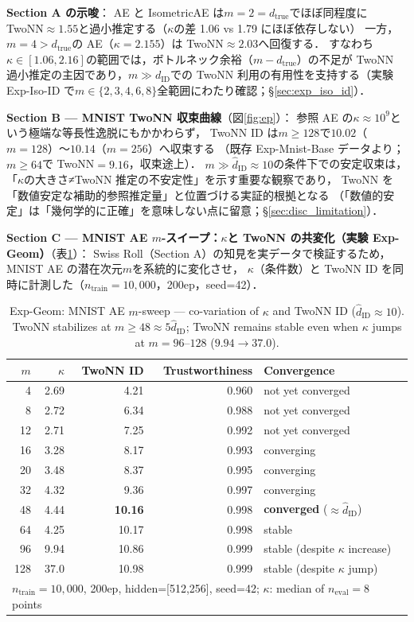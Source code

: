 \documentclass[11pt,a4paper]{jsarticle}
\newcommand{\kap}{\kappa}
\begin{document}
\textbf{Section A の示唆}：
AE と IsometricAE は$m=2=d_\mathrm{true}$でほぼ同程度に TwoNN$\approx1.55$と過小推定する（$\kap$の差 1.06 vs 1.79 にほぼ依存しない）
一方，$m=4>d_\mathrm{true}$の AE（$\kap=2.155$）は TwoNN$\approx2.03$へ回復する．
すなわち$\kap \in [1.06, 2.16]$の範囲では，ボトルネック余裕（$m - d_\mathrm{true}$）の不足が
TwoNN 過小推定の主因であり，$m \gg d_\mathrm{ID}$での TwoNN 利用の有用性を支持する（実験 Exp-Iso-ID で$m \in \{2,3,4,6,8\}$全範囲にわたり確認；§\ref{sec:exp_iso_id}）．

\textbf{Section B — MNIST TwoNN 収束曲線}（図\ref{fig:ep}）：
参照 AE の$\kap \approx 10^9$という極端な等長性逸脱にもかかわらず，
TwoNN ID は$m \geq 128$で$10.02$（$m=128$）〜$10.14$（$m=256$）へ収束する
（既存 Exp-Mnist-Base データより；$m \geq 64$で TwoNN$=9.16$，収束途上）．
$m \gg \hat{d}_\mathrm{ID} \approx 10$の条件下での安定収束は，
「$\kap$の大きさ≠TwoNN 推定の不安定性」を示す重要な観察であり，
TwoNN を「数値安定な補助的参照推定量」と位置づける実証的根拠となる
（「数値的安定」は「幾何学的に正確」を意味しない点に留意；§\ref{sec:disc_limitation}）．

\textbf{Section C — MNIST AE $m$-スイープ：$\kappa$と TwoNN の共変化（実験 Exp-Geom）}（表\ref{tab:eq_mnist}）：
Swiss Roll（Section A）の知見を実データで検証するため，MNIST AE の潜在次元$m$を系統的に変化させ，
$\kap$（条件数）と TwoNN ID を同時に計測した（$n_\mathrm{train}=10{,}000$，200ep，seed=42）．

\begin{table}[H]
\centering
\caption{Exp-Geom: MNIST AE $m$-sweep --- co-variation of $\kap$ and TwoNN ID ($\hat{d}_\mathrm{ID}\approx10$). TwoNN stabilizes at $m \geq 48 \approx 5\hat{d}_\mathrm{ID}$; TwoNN remains stable even when $\kap$ jumps at $m=96$--$128$ ($9.94\to37.0$).}
\label{tab:eq_mnist}
\small
\begin{tabular}{rrrrl}
\toprule
$m$ & $\kap$ & TwoNN ID & Trustworthiness & Convergence \\
\midrule
 4  & 2.69 & 4.21 & 0.960 & not yet converged \\
 8  & 2.72 & 6.34 & 0.988 & not yet converged \\
12  & 2.71 & 7.25 & 0.992 & not yet converged \\
16  & 3.28 & 8.17 & 0.993 & converging \\
20  & 3.48 & 8.37 & 0.995 & converging \\
32  & 4.32 & 9.36 & 0.997 & converging \\
48  & 4.44 & \textbf{10.16} & 0.998 & \textbf{converged} ($\approx\hat{d}_\mathrm{ID}$) \\
64  & 4.25 & 10.17 & 0.998 & stable \\
96  & 9.94 & 10.86 & 0.999 & stable (despite $\kap$ increase) \\
128 & 37.0 & 10.98 & 0.999 & stable (despite $\kap$ jump) \\
\midrule
\multicolumn{5}{l}{$n_\mathrm{train}=10{,}000$, 200ep, hidden=[512,256], seed=42; $\kap$: median of $n_\mathrm{eval}=8$ points} \\
\bottomrule
\end{tabular}
\end{table}
\end{document}
